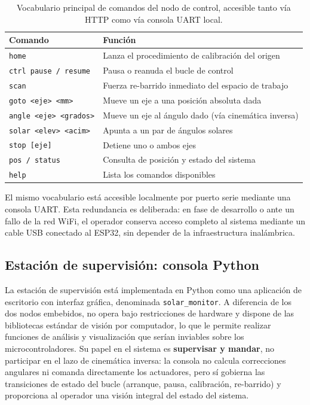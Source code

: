 \begin{table}[htbp]
    \centering
    \footnotesize
    \begin{tabular}{lp{8cm}}
        \toprule
        \textbf{Comando} & \textbf{Función} \\
        \midrule
        \texttt{home}                   & Lanza el procedimiento de calibración del origen \\
        \texttt{ctrl pause / resume}    & Pausa o reanuda el bucle de control \\
        \texttt{scan}                   & Fuerza re-barrido inmediato del espacio de trabajo \\
        \texttt{goto <eje> <mm>}        & Mueve un eje a una posición absoluta dada \\
        \texttt{angle <eje> <grados>}   & Mueve un eje al ángulo dado (vía cinemática inversa) \\
        \texttt{solar <elev> <acim>}    & Apunta a un par de ángulos solares \\
        \texttt{stop [eje]}             & Detiene uno o ambos ejes \\
        \texttt{pos / status}           & Consulta de posición y estado del sistema \\
        \texttt{help}                   & Lista los comandos disponibles \\
        \bottomrule
    \end{tabular}
    \caption{Vocabulario principal de comandos del nodo de control, 
    accesible tanto vía HTTP como vía consola UART local.}
    \label{tab:comandos_motor}
\end{table}

El mismo vocabulario está accesible localmente por puerto serie mediante una consola UART. Esta redundancia es deliberada: en fase de desarrollo o ante un fallo de la red WiFi, el operador conserva acceso completo al sistema mediante un cable USB conectado al ESP32, sin depender de la infraestructura inalámbrica.

\subsection{Estación de supervisión: consola Python}
\label{sec:nodo_consola}

La estación de supervisión está implementada en Python como una aplicación de escritorio con interfaz gráfica, denominada \texttt{solar\_monitor}. A diferencia de los dos nodos embebidos, no opera bajo restricciones de hardware y dispone de las bibliotecas estándar de visión por computador, lo que le permite realizar funciones de análisis y visualización que serían inviables sobre los microcontroladores. Su papel en el sistema es \textbf{supervisar y mandar}, no participar en el lazo de cinemática inversa: la consola no calcula correcciones angulares ni comanda directamente los actuadores, pero sí gobierna las transiciones de estado del bucle (arranque, pausa, calibración, re-barrido) y proporciona al operador una visión integral del estado del sistema.

